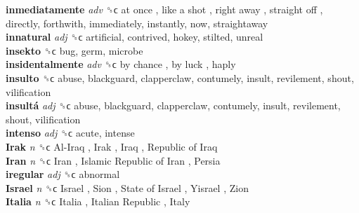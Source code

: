 \textbf{inmediatamente} \emph{adv}  ␝ϲ   at once ,  like a shot ,  right away ,  straight off , directly, forthwith, immediately, instantly, now, straightaway  \\
\textbf{innatural} \emph{adj}  ␝ϲ  artificial, contrived, hokey, stilted, unreal  \\
\textbf{insekto} ␝ϲ  bug, germ, microbe  \\
\textbf{insidentalmente} \emph{adv}  ␝ϲ   by chance ,  by luck , haply  \\
\textbf{insulto} ␝ϲ  abuse, blackguard, clapperclaw, contumely, insult, revilement, shout, vilification  \\
\textbf{insultá} \emph{adj}  ␝ϲ  abuse, blackguard, clapperclaw, contumely, insult, revilement, shout, vilification  \\
\textbf{intenso} \emph{adj}  ␝ϲ  acute, intense  \\
\textbf{Irak} \emph{n}  ␝ϲ   Al-Iraq ,  Irak ,  Iraq ,  Republic of Iraq   \\
\textbf{Iran} \emph{n}  ␝ϲ   Iran ,  Islamic Republic of Iran ,  Persia   \\
\textbf{iregular} \emph{adj}  ␝ϲ  abnormal  \\
\textbf{Israel} \emph{n}  ␝ϲ   Israel ,  Sion ,  State of Israel ,  Yisrael ,  Zion   \\
\textbf{Italia} \emph{n}  ␝ϲ   Italia ,  Italian Republic ,  Italy   \\
